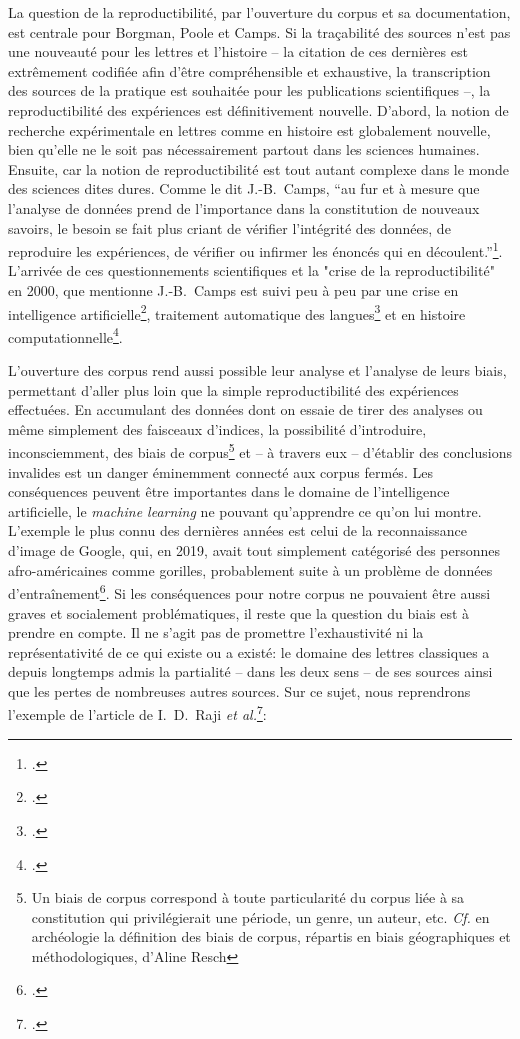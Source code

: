 La question de la reproductibilité, par l'ouverture du corpus et sa documentation, est centrale pour Borgman, Poole et Camps. Si la traçabilité des sources n'est pas une nouveauté pour les lettres et l'histoire -- la citation de ces dernières est extrêmement codifiée afin d'être compréhensible et exhaustive, la transcription des sources de la pratique est souhaitée pour les publications scientifiques --, la reproductibilité des expériences est définitivement nouvelle. D'abord, la notion de recherche expérimentale en lettres comme en histoire est globalement nouvelle, bien qu'elle ne le soit pas nécessairement partout dans les sciences humaines. Ensuite, car la notion de reproductibilité est tout autant complexe dans le monde des sciences dites dures. Comme le dit J.-B.~Camps, ``au fur et à mesure que l’analyse de données prend de l’importance dans la constitution de nouveaux savoirs, le besoin se fait plus criant de vérifier l’intégrité des données, de reproduire les expériences, de vérifier ou infirmer les énoncés qui en découlent.''\footcite{camps_ou_2018}. L'arrivée de ces questionnements scientifiques et la "crise de la reproductibilité" en 2000, que mentionne J.-B.~Camps est suivi peu à peu par une crise en intelligence artificielle\footcite{hutson2018artificial}, traitement automatique des langues\footcite{belz2021systematic} et en histoire computationnelle\footcite{eijnatten_big_2013}.

L'ouverture des corpus rend aussi possible leur analyse et l'analyse de leurs biais, permettant d'aller plus loin que la simple reproductibilité des expériences effectuées. En accumulant des données dont on essaie de tirer des analyses ou même simplement des faisceaux d'indices, la possibilité d'introduire, inconsciemment, des biais de corpus\footnote{Un biais de corpus correspond à toute particularité du corpus liée à sa constitution qui privilégierait une période, un genre, un auteur, etc. \textit{Cf.} en archéologie la définition des biais de corpus, répartis en biais géographiques et méthodologiques, d'Aline Resch\textcite[p.~144]{resch:tel-03218240}} et -- à travers eux -- d'établir des conclusions invalides est un danger éminemment connecté aux corpus fermés. Les conséquences peuvent être importantes dans le domaine de l'intelligence artificielle, le \textit{machine learning} ne pouvant qu'apprendre ce qu'on lui montre. L'exemple le plus connu des dernières années est celui de la reconnaissance d'image de Google, qui, en 2019, avait tout simplement catégorisé des personnes afro-américaines comme gorilles, probablement suite à un problème de données d'entraînement\footcite{lohr2018facial, chokshi2019facial}. Si les conséquences pour notre corpus ne pouvaient être aussi graves et socialement problématiques, il reste que la question du biais est à prendre en compte. Il ne s'agit pas de promettre l'exhaustivité ni la représentativité de ce qui existe ou a existé: le domaine des lettres classiques a depuis longtemps admis la partialité -- dans les deux sens -- de ses sources ainsi que les pertes de nombreuses autres sources. Sur ce sujet, nous reprendrons l'exemple de l'article de I.~D.~Raji \textit{et al.}\footcite{raji2021ai}:


